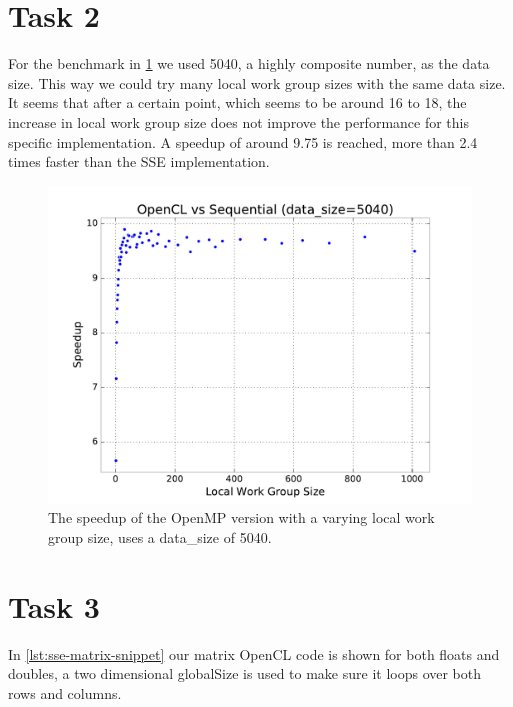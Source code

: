 \documentclass[final]{report}
\begin{document}
\section{Task 2}
For the benchmark in \cref{fig:opencl-localsize-sweep} we used 5040, a highly composite number, as the data size.
This way we could try many local work group sizes with the same data size.
It seems that after a certain point, which seems to be around 16 to 18, the increase in local work group size does not improve the performance for this specific implementation.
A speedup of around 9.75 is reached, more than 2.4 times faster than the SSE implementation.
\begin{figure}[H]
\centering
    \includegraphics[width=\linewidth]{resources/opencl-localsize-sweep.pdf}
    \caption{The speedup of the OpenMP version with a varying local work group size, uses a data\_size of 5040.}
    \label{fig:opencl-localsize-sweep}
\end{figure}
\section{Task 3}
In \cref{lst:sse-matrix-snippet} our matrix OpenCL code is shown for both floats and doubles, a two dimensional globalSize is used to make sure it loops over both rows and columns.

\end{document}
